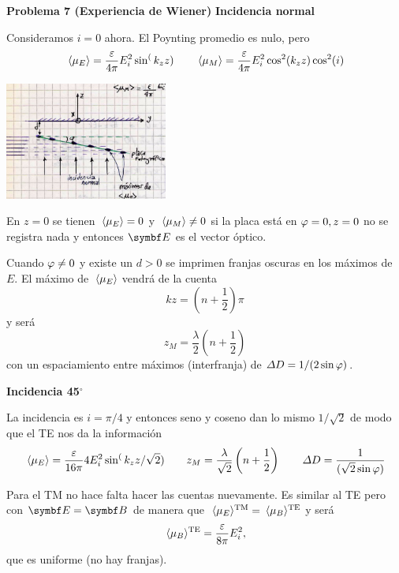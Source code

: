 \documentclass[10pt,oneside]{CBFT_book}
\begin{document}
\begin{ejemplo}{\bf Problema 7 (Experiencia de Wiener)}
{\bf Incidencia normal}

Consideramos $i=0$ ahora. El Poynting promedio es nulo, pero 
\[
	\:\langle \mu_E \rangle = \frac{\varepsilon}{4\pi} E_i^2 \sin^(k_z z) 
	\qquad 
	\:\langle \mu_M \rangle = \frac{\varepsilon}{4\pi} E_i^2 \cos^2(k_zz) \cos^2(i) 
\]

\includegraphics[width=0.40\textwidth]{images/fig_ft1_problema7B_ondas.jpg} 

En $ z = 0 $ se tienen $ \:\langle \mu_E \rangle = 0 $ y $ \:\langle \mu_M \rangle \neq 0$ si la placa está en $\varphi=0, z=0$
no se registra nada y entonces $\vb{E}$ es el vector óptico.

Cuando $ \varphi \neq 0 $ y existe un $ d > 0 $  se imprimen franjas oscuras en los máximos de $E$.
El máximo de $ \:\langle \mu_E \rangle $ vendrá de la cuenta
\[
	kz = \left( n + \frac{1}{2}\right) \pi
\]
y será 
\[
	z_M = \frac{\lambda}{2} \left( n + \frac{1}{2}\right)
\]
con un espaciamiento entre máximos (interfranja) de $ \Delta D = 1 / (2\sin\varphi)$.

{\bf Incidencia 45$^\circ$}

La incidencia es $ i = \pi / 4 $ y entonces seno y coseno dan lo mismo $1/\sqrt{2}$ de modo
que el TE nos da la información
\[
	\:\langle \mu_E \rangle = \frac{\varepsilon}{16\pi} 4 E_i^2 \sin^(k_z z / \sqrt{2})  \qquad 
	z_M = \frac{\lambda}{\sqrt{2}} \left( n + \frac{1}{2}\right) \qquad 
	\Delta D = \frac{ 1 }{ ( \sqrt{2} \sin\varphi ) }
\]

Para el TM no hace falta hacer las cuentas nuevamente. Es similar al TE pero con $\vb{E}=\vb{B}$
de manera que $ \:\langle \mu_E \rangle^{\text{TM}} = \:\langle \mu_B \rangle^{\text{TE}} $ y será
\[
	\:\langle \mu_B \rangle^{\text{TE}} = \frac{\varepsilon}{8\pi} E_i^2,
\]
que es uniforme (no hay franjas).
 
\end{ejemplo}
\end{document}
